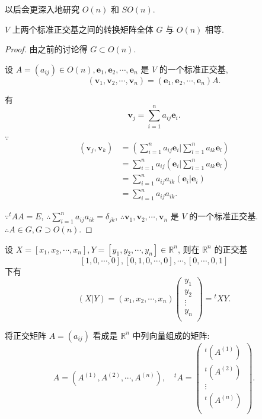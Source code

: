 \documentclass[color=black,device=normal,lang=cn,mode=geye]{elegantnote}
\begin{document}
以后会更深入地研究 $O(n)$ 和 $SO(n)$.
\begin{theorem}[书上的定理 8]
    $V$ 上两个标准正交基之间的转换矩阵全体 $G$ 与 $O(n)$ 相等.
\end{theorem}
\begin{proof}
    由之前的讨论得 $G\subset O(n)$.

    设 $A=(a_{ij})\in O(n),\boldsymbol{e}_1,\boldsymbol{e}_2,\cdots,\boldsymbol{e}_n$ 是 $V$ 的一个标准正交基,
    \[(\boldsymbol{v}_1,\boldsymbol{v}_2,\cdots,\boldsymbol{v}_n)=(\boldsymbol{e}_1,\boldsymbol{e}_2,\cdots,\boldsymbol{e}_n)A.\]

    有
    \[\boldsymbol{v}_j=\sum\limits_{i=1}^na_{ij}\boldsymbol{e}_i.\]

    $\because$
    \begin{align*}
        (\boldsymbol{v}_j,\boldsymbol{v}_k) & =\left(\sum\limits_{i=1}^na_{ij}\boldsymbol{e}_i\bigg|\sum\limits_{l=1}^na_{lk}\boldsymbol{e}_l\right) \\
        & =\sum\limits_{i=1}^na_{ij}\left(\boldsymbol{e}_i\bigg|\sum\limits_{l=1}^na_{lk}\boldsymbol{e}_l\right) \\
        & =\sum\limits_{i=1}^na_{ij}a_{ik}\left(\boldsymbol{e}_i|\boldsymbol{e}_i\right) \\
        & =\sum\limits_{i=1}^na_{ij}a_{ik}.
    \end{align*}

    $\because{}^tAA=E$, $\therefore\sum\limits_{i=1}^na_{ij}a_{ik}=\delta_{jk}$, $\therefore\boldsymbol{v}_1,\boldsymbol{v}_2,\cdots,\boldsymbol{v}_n$ 是 $V$ 的一个标准正交基. $\therefore A\in G,G\supset O(n)$.
\end{proof}
设 $X=[x_1,x_2,\cdots,x_n],Y=[y_1,y_2,\cdots,y_n]\in\mathbb{R}^n$, 则在 $\mathbb{R}^n$ 的正交基
\[[1,0,\cdots,0],[0,1,0,\cdots,0],\cdots,[0,\cdots,0,1]\]
下有
\[(X|Y)=(x_1,x_2,\cdots,x_n)\begin{pmatrix}
    y_1 \\
    y_2 \\
    \vdots \\
    y_n \\
\end{pmatrix}={}^tXY.\]

将正交矩阵 $A=(a_{ij})$ 看成是 $\mathbb{R}^n$ 中列向量组成的矩阵:
\[A=(A^{(1)},A^{(2)},\cdots,A^{(n)}),\quad{}^tA=\begin{pmatrix}
    {}^t(A^{(1)}) \\
    {}^t(A^{(2)}) \\
    \vdots \\
    {}^t(A^{(n)}) \\
\end{pmatrix}.\]
\end{document}
